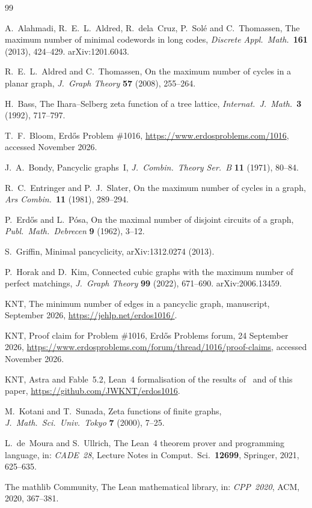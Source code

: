\documentclass[11pt]{article}
\theoremstyle{definition}
\theoremstyle{remark}
\numberwithin{equation}{section}
\begin{document}
\begin{thebibliography}{99}\small

 A.~Alahmadi, R.~E.~L.~Aldred, R.~dela~Cruz, P.~Sol\'e and C.~Thomassen, The maximum
number of minimal codewords in long codes, \emph{Discrete Appl.\ Math.}\ \textbf{161} (2013),
424--429. arXiv:1201.6043.

 R.~E.~L.~Aldred and C.~Thomassen, On the maximum number of cycles in a planar graph,
\emph{J.~Graph Theory} \textbf{57} (2008), 255--264.

 H.~Bass, The Ihara--Selberg zeta function of a tree lattice, \emph{Internat.\
J.~Math.}\ \textbf{3} (1992), 717--797.

 T.~F.~Bloom, Erd\H{o}s Problem \#1016, \url{https://www.erdosproblems.com/1016},
accessed November 2026.

 J.~A.~Bondy, Pancyclic graphs~I, \emph{J.~Combin.\ Theory Ser.~B} \textbf{11}
(1971), 80--84.

 R.~C.~Entringer and P.~J.~Slater, On the maximum number of cycles in a graph,
\emph{Ars Combin.}\ \textbf{11} (1981), 289--294.

 P.~Erd\H{o}s and L.~P\'osa, On the maximal number of disjoint circuits of a graph,
\emph{Publ.\ Math.\ Debrecen} \textbf{9} (1962), 3--12.

 S.~Griffin, Minimal pancyclicity, arXiv:1312.0274 (2013).

 P.~Horak and D.~Kim, Connected cubic graphs with the maximum number of perfect
matchings, \emph{J.~Graph Theory} \textbf{99} (2022), 671--690. arXiv:2006.13459.

 KNT, The minimum number of edges in a pancyclic graph, manuscript, September 2026,
\url{https://jehlp.net/erdos1016/}.

 KNT, Proof claim for Problem \#1016, Erd\H{o}s Problems forum, 24 September 2026,
\url{https://www.erdosproblems.com/forum/thread/1016/proof-claims}, accessed November 2026.

 KNT, Astra and Fable~5.2, Lean~4 formalisation of the results of~\cite{KNT} and of
this paper, \url{https://github.com/JWKNT/erdos1016}.

 M.~Kotani and T.~Sunada, Zeta functions of finite graphs, \emph{J.~Math.\ Sci.\ Univ.\
Tokyo} \textbf{7} (2000), 7--25.

 L.~de~Moura and S.~Ullrich, The Lean~4 theorem prover and programming language,
in: \emph{CADE~28}, Lecture Notes in Comput.\ Sci.\ \textbf{12699}, Springer, 2021, 625--635.

\bibitem{Mathlib} The mathlib Community, The Lean mathematical library, in: \emph{CPP~2020}, ACM,
2020, 367--381.

\end{thebibliography}
\end{document}

